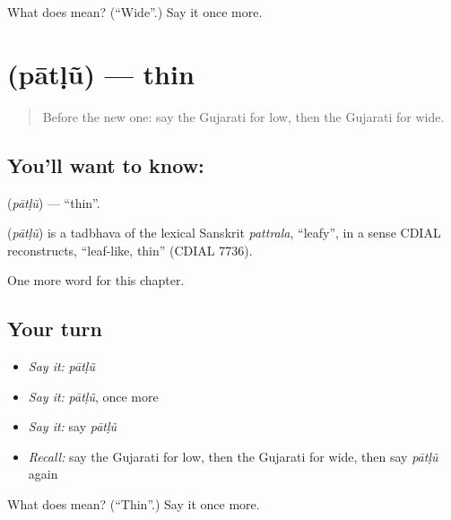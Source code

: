 \begin{tcolorbox}[breakable,colback=teal!4,colframe=teal!35!black,title={Before you move on}]
What does  mean? (\textquotedblleft{}Wide\textquotedblright{}.) Say it once more.
\end{tcolorbox}
\section[\texorpdfstring{\gu{પાતળું} (pātḷũ)}{પાતળું (pātḷũ)}]{ (pātḷũ) — thin}

\label{lesson:GU-C131-patlu}



\begin{quote}
Before the new one: say the Gujarati for low, then the Gujarati for wide.
\end{quote}

\subsection*{You'll want to know: }
\textbf{} (\emph{pātḷũ}) — \textquotedblleft{}thin\textquotedblright{}.

\begin{cousinweb}
\textbf{} (\emph{pātḷũ}) is a tadbhava of the lexical Sanskrit \emph{pattrala}, \textquotedblleft{}leafy\textquotedblright{}, in a sense CDIAL reconstructs, \textquotedblleft{}leaf-like, thin\textquotedblright{} (CDIAL 7736).
\end{cousinweb}

\begin{grammarlens}[title={What you've built}]
One more word for this chapter.
\end{grammarlens}

\subsection*{Your turn}
\begin{itemize}
\raggedright
  \item \emph{Say it:} \emph{pātḷũ}
  \item \emph{Say it:} \emph{pātḷũ}, once more
  \item \emph{Say it:} say \emph{pātḷũ}
  \item \emph{Recall:} say the Gujarati for low, then the Gujarati for wide, then say \emph{pātḷũ} again
\end{itemize}

\begin{tcolorbox}[breakable,colback=teal!4,colframe=teal!35!black,title={Before you move on}]
What does  mean? (\textquotedblleft{}Thin\textquotedblright{}.) Say it once more.
\end{tcolorbox}
